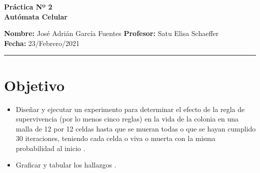 \documentclass[a4paper]{article}
\begin{document}
\begin{center}

\large \bf Práctica Nº 2   %
\\ %
Autómata Celular
\end{center} %
\textbf{Nombre:}   %
José Adrián García Fuentes
\hfill  %
\textbf{Profesor:}   %
Satu Elisa Schaeffer \hfill
\\
\textbf{Fecha:} 23/Febrero/2021        %
\\
\hrule    %
\medskip
\section{Objetivo}  %
\begin{itemize}   %
    \item Diseñar y ejecutar un experimento para determinar el efecto de la regla de supervivencia (por lo menos cinco reglas) en la vida de la colonia en una malla de 12 por 12 celdas hasta que se mueran todas o que se hayan cumplido 30 iteraciones, teniendo cada celda o viva o muerta con la misma probabilidad al inicio \cite{p2}.   %
    \item Graficar y tabular los hallazgos \cite{p2}.
\end{itemize}
\end{document}
